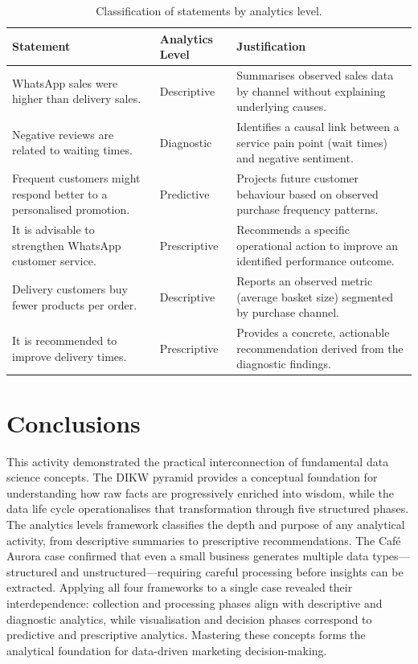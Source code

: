 \documentclass[12pt, a4paper]{article}
\newcommand{\Hcell}[1]{{\color{white}\textbf{#1}}}
\begin{document}
\begin{table}[H]
\centering
\caption{Classification of statements by analytics level.}
\label{tab:partD}
\small
\begin{tabularx}{\textwidth}{X p{2.8cm} X}
\toprule
\rowcolor{aqHdr}
\Hcell{Statement} &
\Hcell{Analytics Level} &
\Hcell{Justification} \\
\midrule
WhatsApp sales were higher than delivery sales. &
  Descriptive &
  Summarises observed sales data by channel without explaining underlying causes. \\
\rowcolor{aqRow}
Negative reviews are related to waiting times. &
  Diagnostic &
  Identifies a causal link between a service pain point (wait times) and negative
  sentiment. \\
Frequent customers might respond better to a personalised promotion. &
  Predictive &
  Projects future customer behaviour based on observed purchase frequency patterns. \\
\rowcolor{aqRow}
It is advisable to strengthen WhatsApp customer service. &
  Prescriptive &
  Recommends a specific operational action to improve an identified performance
  outcome. \\
Delivery customers buy fewer products per order. &
  Descriptive &
  Reports an observed metric (average basket size) segmented by purchase channel. \\
\rowcolor{aqRow}
It is recommended to improve delivery times. &
  Prescriptive &
  Provides a concrete, actionable recommendation derived from the diagnostic
  findings. \\
\bottomrule
\end{tabularx}
\end{table}

\newpage

\section*{Conclusions}

This activity demonstrated the practical interconnection of fundamental data science
concepts. The DIKW pyramid provides a conceptual foundation for understanding how raw
facts are progressively enriched into wisdom, while the data life cycle operationalises
that transformation through five structured phases. The analytics levels framework
classifies the depth and purpose of any analytical activity, from descriptive summaries
to prescriptive recommendations. The Caf\'{e} Aurora case confirmed that even a small
business generates multiple data types---structured and unstructured---requiring careful
processing before insights can be extracted. Applying all four frameworks to a single
case revealed their interdependence: collection and processing phases align with
descriptive and diagnostic analytics, while visualisation and decision phases correspond
to predictive and prescriptive analytics. Mastering these concepts forms the analytical
foundation for data-driven marketing decision-making.
\end{document}
